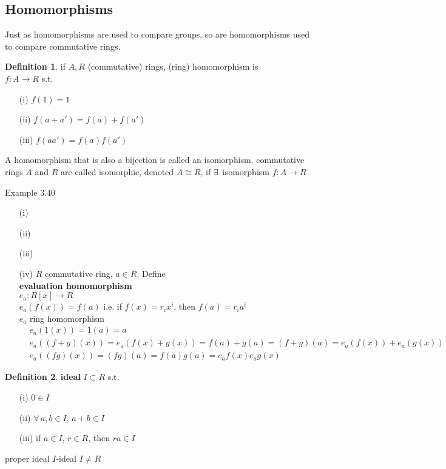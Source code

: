 \documentclass[twoside,landscape]{amsart}
\theoremstyle{plain}
\theoremstyle{definition}
\newtheorem{definition}{Definition}
\theoremstyle{remark}
\begin{document}
\begin{multicols*}{2}
\subsection{ Homomorphisms }

Just as homomorphisms are used to compare groups, so are homomorphisms used to compare commutative rings.  

\begin{definition} if $A,R$ (commutative) rings, (ring) homomorphism is \\
$f:A\to R$ s.t.
\begin{enumerate}
  \item[(i)] $f(1) = 1 $ 
  \item[(ii)] $f(a+a') = f(a) + f(a')$
  \item[(iii)] $f(aa') = f(a)f(a')$
\end{enumerate}
\end{definition}

A homomorphism that is also a bijection is called an isomorphism.  commutative rings $A$ and $R$ are called isomorphic, denoted $A\cong R$, if $\exists \, $ isomorphism $f:A \to R$

Example 3.40

\begin{enumerate}
\item[(i)]
\item[(ii)]
\item[(iii)]
\item[(iv)] $R$ commutative ring, $a\in R$.  Define \\
\textbf{evaluation homomorphism } \\
$e_a: R[x] \to R$ \\
$e_a(f(x)) = f(a)$ i.e. if $f(x) = r_i x^i$, then $f(a) = r_i a^i$  \\
$e_a$ ring homomorphism
\[
\begin{aligned}
  & e_a(1(x)) = 1(a) = a \\ 
  & e_a((f+g)(x)) = e_a(f(x) + g(x)) = f(a) + g(a) = (f+g)(a) = e_a(f(x)) + e_a(g(x)) \\ 
  & e_a((fg)(x)) = (fg)(a) = f(a) g(a) = e_a f(x) e_a g(x)
\end{aligned}
\]

\end{enumerate}



\begin{definition} \textbf{ideal} $I \subset R$ s.t. 
\begin{enumerate}
\item[(i)] $0 \in I$ 
\item[(ii)] $\forall \, a,b \in I$, $a+b \in I$
\item[(iii)] if $a\in I$, $r \in R$, then $ra \in I$
\end{enumerate}
proper ideal $I$-ideal $I\neq R$
\end{definition}



\end{multicols*}
\end{document}
